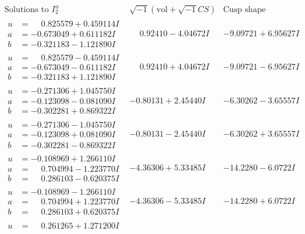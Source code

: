 \documentclass[1p]{elsarticle_modified}
\theoremstyle{definition}
\newcommand{\I}{\sqrt{-1}}
\begin{document}
$$\begin{array}{c|c|c}  
\text{Solutions to }I^u_{2}& \I (\text{vol} + \sqrt{-1}CS) & \text{Cusp shape}\\
 \hline 
\begin{aligned}
u &= \phantom{-}0.825579 + 0.459114 I \\
a &= -0.673049 + 0.611182 I \\
b &= -0.321183 - 1.121890 I\end{aligned}
 & \phantom{-}0.92410 - 4.04672 I & -9.09721 + 6.95627 I \\ \hline\begin{aligned}
u &= \phantom{-}0.825579 - 0.459114 I \\
a &= -0.673049 - 0.611182 I \\
b &= -0.321183 + 1.121890 I\end{aligned}
 & \phantom{-}0.92410 + 4.04672 I & -9.09721 - 6.95627 I \\ \hline\begin{aligned}
u &= -0.271306 + 1.045750 I \\
a &= -0.123098 - 0.081090 I \\
b &= -0.302281 + 0.869322 I\end{aligned}
 & -0.80131 + 2.45440 I & -6.30262 - 3.65557 I \\ \hline\begin{aligned}
u &= -0.271306 - 1.045750 I \\
a &= -0.123098 + 0.081090 I \\
b &= -0.302281 - 0.869322 I\end{aligned}
 & -0.80131 - 2.45440 I & -6.30262 + 3.65557 I \\ \hline\begin{aligned}
u &= -0.108969 + 1.266110 I \\
a &= \phantom{-}0.704994 - 1.223770 I \\
b &= \phantom{-}0.286103 - 0.620375 I\end{aligned}
 & -4.36306 + 5.33485 I & -14.2280 - 6.0722 I \\ \hline\begin{aligned}
u &= -0.108969 - 1.266110 I \\
a &= \phantom{-}0.704994 + 1.223770 I \\
b &= \phantom{-}0.286103 + 0.620375 I\end{aligned}
 & -4.36306 - 5.33485 I & -14.2280 + 6.0722 I \\ \hline\begin{aligned}
u &= \phantom{-}0.261265 + 1.271200 I \\

\end{aligned}
\end{array}$$
\end{document}
